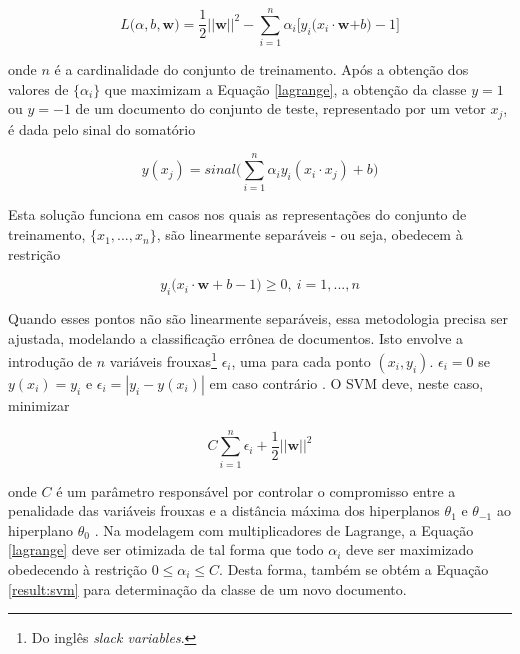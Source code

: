 \begin{equation}
\label{lagrange}
\ensuremath{L(\alpha, b,}\textbf{w}\ensuremath{) = \frac{1}{2} ||}\textbf{w}\ensuremath{||^2 - \sum_{i = 1}^n \alpha_i\big[y_i(x_i \cdot}\textbf{w}\ensuremath{+ b) -1 \big]} %
\end{equation}

onde \ensuremath{n} é a cardinalidade do conjunto de treinamento. Após a obtenção dos valores de \ensuremath{\{\alpha_i\}} que maximizam a Equação \ref{lagrange}, a obtenção da classe \ensuremath{y = 1} ou \ensuremath{y = -1} de um documento do conjunto de teste, representado por um vetor \ensuremath{x_j}, é dada pelo sinal do somatório \cite{mono-puc}

\begin{equation}
\label{result:svm}
\ensuremath{y(x_j) = sinal\bigg(\sum_{i = 1}^n \alpha_iy_i(x_i \cdot x_j) + b\bigg)} %
\end{equation}

Esta solução funciona em casos nos quais as representações do conjunto de treinamento, \ensuremath{\{x_1, ..., x_n\}}, são linearmente separáveis - ou seja, obedecem à restrição \cite{mono-puc}

\begin{equation}
\label{restr2:svm}
\ensuremath{y_i(x_i \cdot} \textbf{w} + \ensuremath{b -1) \geq 0,\ i = 1,...,n}
\end{equation}

Quando esses pontos não são linearmente separáveis, essa metodologia precisa ser ajustada, modelando a classificação errônea de documentos. Isto envolve a introdução de \ensuremath{n} variáveis frouxas\footnote{Do inglês \emph{slack variables}.} \ensuremath{\epsilon_i}, uma para cada ponto \ensuremath{(x_i, y_i)}. \ensuremath{\epsilon_i = 0} se \ensuremath{y(x_i) = y_i} e \ensuremath{\epsilon_i = |y_i - y(x_i)|} em caso contrário \cite{bishop}. O SVM deve, neste caso, minimizar \cite{mono-puc}

\begin{equation}
\label{nonlin:svm}
\ensuremath{C\sum_{i=1}^n\epsilon_i + \frac{1}{2}||}\textbf{w}\ensuremath{||^2}
\end{equation}

onde \ensuremath{C} é um parâmetro responsável por controlar o compromisso entre a penalidade das variáveis frouxas e a distância máxima dos hiperplanos \ensuremath{\theta_1} e \ensuremath{\theta_{-1}} ao hiperplano \ensuremath{\theta_0} \cite{mono-puc}. Na modelagem com multiplicadores de Lagrange, a Equação \ref{lagrange} deve ser otimizada de tal forma que todo \ensuremath{\alpha_i} deve ser maximizado obedecendo à restrição \ensuremath{0 \leq \alpha_i \leq C}. Desta forma, também se obtém a Equação \ref{result:svm} para determinação da classe de um novo documento.

